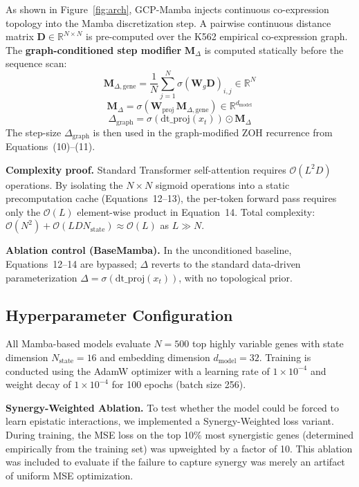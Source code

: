 \documentclass{bioinfo}
\begin{document}
As shown in Figure~\ref{fig:arch}, GCP-Mamba injects continuous co-expression topology into the Mamba discretization step. A pairwise continuous distance matrix $\mathbf{D} \in \mathbb{R}^{N \times N}$ is pre-computed over the K562 empirical co-expression graph. The \textbf{graph-conditioned step modifier} $\mathbf{M}_\Delta$ is computed statically before the sequence scan:
\begin{equation}
\mathbf{M}_{\Delta,\text{gene}} = \frac{1}{N}\sum_{j=1}^{N} \sigma(\mathbf{W}_g \mathbf{D})_{i,j} \in \mathbb{R}^N
\end{equation}
\begin{equation}
\mathbf{M}_\Delta = \sigma(\mathbf{W}_{\text{proj}} \, \mathbf{M}_{\Delta,\text{gene}}) \in \mathbb{R}^{d_{\text{model}}}
\end{equation}
\begin{equation}
\Delta_{\text{graph}} = \sigma(\text{dt\_proj}(x_t)) \odot \mathbf{M}_\Delta
\end{equation}
The step-size $\Delta_{\text{graph}}$ is then used in the graph-modified ZOH recurrence from Equations~(10)--(11).

\textbf{Complexity proof.} Standard Transformer self-attention requires $\mathcal{O}(L^2 D)$ operations. By isolating the $N \times N$ sigmoid operations into a static precomputation cache (Equations~12--13), the per-token forward pass requires only the $\mathcal{O}(L)$ element-wise product in Equation~14. Total complexity: $\mathcal{O}(N^2) + \mathcal{O}(LDN_{\text{state}}) \approx \mathcal{O}(L)$ as $L \gg N$.

\textbf{Ablation control (BaseMamba).} In the unconditioned baseline, Equations~12--14 are bypassed; $\Delta$ reverts to the standard data-driven parameterization $\Delta = \sigma(\text{dt\_proj}(x_t))$, with no topological prior.

\subsection{Hyperparameter Configuration}

All Mamba-based models evaluate $N = 500$ top highly variable genes with state dimension $N_{\text{state}} = 16$ and embedding dimension $d_{\text{model}} = 32$. Training is conducted using the AdamW optimizer with a learning rate of $1 \times 10^{-4}$ and weight decay of $1 \times 10^{-4}$ for 100 epochs (batch size 256).

\textbf{Synergy-Weighted Ablation.} To test whether the model could be forced to learn epistatic interactions, we implemented a Synergy-Weighted loss variant. During training, the MSE loss on the top 10\% most synergistic genes (determined empirically from the training set) was upweighted by a factor of 10. This ablation was included to evaluate if the failure to capture synergy was merely an artifact of uniform MSE optimization.
\end{document}
